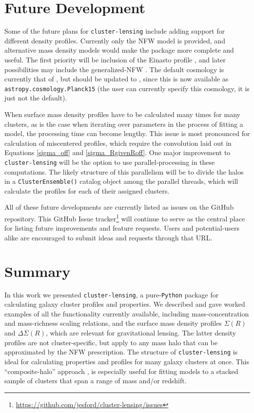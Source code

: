 \documentclass[twocolumn]{aastex6}
\newcommand{\code}{\lstinline[style=codeintext]}
\begin{document}

\section{Future Development}
\label{future}

Some of the future plans for \code{cluster-lensing} include adding support for different density profiles. Currently only the NFW model is provided, and alternative mass density models would make the package more complete and useful. The first priority will be inclusion of the Einasto profile \citep{Einasto65}, and later possibilities may include the generalized-NFW \citep{Zhao96}. The default cosmology is currently that of \citet{PlanckXVI}, but should be updated to \citet{PlanckXIII_15}, since this is now available as \code{astropy.cosmology.Planck15} (the user can currently specify this cosmology, it is just not the default).

When surface mass density profiles have to be calculated many times for many clusters, as is the case when iterating over parameters in the process of fitting a model, the processing time can become lengthy. This issue is most pronounced for calculation of miscentered profiles, which require the convolution laid out in Equations \ref{sigma_off} and \ref{sigma_RgivenRoff}. One major improvement to \code{cluster-lensing} will be the option to use parallel-processing in these computations. The likely structure of this parallelism will be to divide the halos in a \code{ClusterEnsemble()} catalog object among the parallel threads, which will calculate the profiles for each of their assigned clusters.

All of these future developments are currently listed as issues on the GitHub repository. This GitHub Issue tracker\footnote{\url{https://github.com/jesford/cluster-lensing/issues}} will continue to serve as the central place for listing future improvements and feature requests. Users and potential-users alike are encouraged to submit ideas and requests through that URL.


\section{Summary}
\label{summary}

In this work we presented \code{cluster-lensing}, a pure-\code{Python} package for calculating galaxy cluster profiles and properties. We described and gave worked examples of all the functionality currently available, including mass-concentration and mass-richness scaling relations, and the surface mass density profiles $\Sigma(R)$ and $\Delta\Sigma(R)$, which are relevant for gravitational lensing. The latter density profiles are not cluster-specific, but apply to any mass halo that can be approximated by the NFW prescription. The structure of \code{cluster-lensing} is ideal for calculating properties and profiles for many galaxy clusters at once. This ``composite-halo'' approach \citep[i.e.][]{Ford15}, is especially useful for fitting models to a stacked sample of clusters that span a range of mass and/or redshift.
\end{document}
